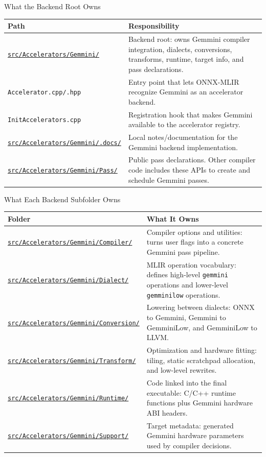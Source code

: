 \documentclass[aspectratio=169,10pt]{beamer}
\newcommand{\code}[1]{\texttt{\footnotesize #1}}
\newcommand{\repoRoot}{/home/lahcen/toolchains/onnx-mlir-xcompile/onnx-mlir}
\newcommand{\pathcode}[1]{\href{run:\repoRoot/#1}{\texttt{\scriptsize #1}}}
\begin{document}
\begin{frame}{What the Backend Root Owns}
  \scriptsize
  \begin{tabularx}{\textwidth}{@{}lX@{}}
    \toprule
    Path & Responsibility \\
    \midrule
    \pathcode{src/Accelerators/Gemmini/} &
      Backend root: owns Gemmini compiler integration, dialects, conversions, transforms, runtime, target info, and pass declarations. \\
    \code{Accelerator.cpp/.hpp} &
      Entry point that lets ONNX-MLIR recognize Gemmini as an accelerator backend. \\
    \code{InitAccelerators.cpp} &
      Registration hook that makes Gemmini available to the accelerator registry. \\
    \pathcode{src/Accelerators/Gemmini/.docs/} &
      Local notes/documentation for the Gemmini backend implementation. \\
    \pathcode{src/Accelerators/Gemmini/Pass/} &
      Public pass declarations. Other compiler code includes these APIs to create and schedule Gemmini passes. \\
    \bottomrule
  \end{tabularx}
\end{frame}

\begin{frame}{What Each Backend Subfolder Owns}
  \scriptsize
  \begin{tabularx}{\textwidth}{@{}lX@{}}
    \toprule
    Folder & What It Owns \\
    \midrule
    \pathcode{src/Accelerators/Gemmini/Compiler/} &
      Compiler options and utilities: turns user flags into a concrete Gemmini pass pipeline. \\
    \pathcode{src/Accelerators/Gemmini/Dialect/} &
      MLIR operation vocabulary: defines high-level \code{gemmini} operations and lower-level \code{gemminilow} operations. \\
    \pathcode{src/Accelerators/Gemmini/Conversion/} &
      Lowering between dialects: ONNX to Gemmini, Gemmini to GemminiLow, and GemminiLow to LLVM. \\
    \pathcode{src/Accelerators/Gemmini/Transform/} &
      Optimization and hardware fitting: tiling, static scratchpad allocation, and low-level rewrites. \\
    \pathcode{src/Accelerators/Gemmini/Runtime/} &
      Code linked into the final executable: C/C++ runtime functions plus Gemmini hardware ABI headers. \\
    \pathcode{src/Accelerators/Gemmini/Support/} &
      Target metadata: generated Gemmini hardware parameters used by compiler decisions. \\
    \bottomrule
  \end{tabularx}
\end{frame}
\end{document}
